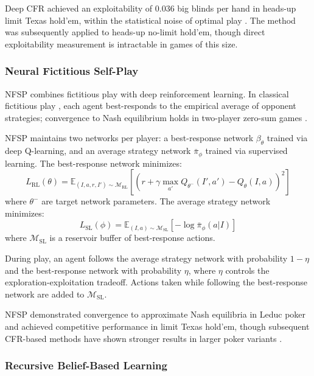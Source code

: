 Deep CFR achieved an exploitability of 0.036 big blinds per hand in heads-up limit Texas hold'em, within the statistical noise of optimal play \citep{Brown2019}. The method was subsequently applied to heads-up no-limit hold'em, though direct exploitability measurement is intractable in games of this size.

\subsubsection{Neural Fictitious Self-Play}

NFSP \citep{heinrich2016deep} combines fictitious play with deep reinforcement learning. In classical fictitious play \citep{Brown1951}, each agent best-responds to the empirical average of opponent strategies; convergence to Nash equilibrium holds in two-player zero-sum games \citep{Robinson1951}.

NFSP maintains two networks per player: a best-response network $\beta_\theta$ trained via deep Q-learning, and an average strategy network $\bar{\pi}_\phi$ trained via supervised learning. The best-response network minimizes:
\begin{equation}
L_{\text{RL}}(\theta) = \mathbb{E}_{(I, a, r, I') \sim \mathcal{M}_{\text{RL}}} \left[ \left( r + \gamma \max_{a'} Q_{\theta^-}(I', a') - Q_\theta(I, a) \right)^2 \right]
\end{equation}
where $\theta^-$ are target network parameters. The average strategy network minimizes:
\begin{equation}
L_{\text{SL}}(\phi) = \mathbb{E}_{(I, a) \sim \mathcal{M}_{\text{SL}}} \left[ -\log \bar{\pi}_\phi(a | I) \right]
\end{equation}
where $\mathcal{M}_{\text{SL}}$ is a reservoir buffer of best-response actions.

During play, an agent follows the average strategy network with probability $1 - \eta$ and the best-response network with probability $\eta$, where $\eta$ controls the exploration-exploitation tradeoff. Actions taken while following the best-response network are added to $\mathcal{M}_{\text{SL}}$.

NFSP demonstrated convergence to approximate Nash equilibria in Leduc poker and achieved competitive performance in limit Texas hold'em, though subsequent CFR-based methods have shown stronger results in larger poker variants \citep{moravcik2017}.

\subsubsection{Recursive Belief-Based Learning}

